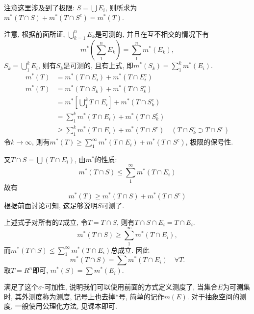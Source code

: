 \documentclass[12pt,a4paper,openany]{book}
\begin{document}
\begin{enumerate}
\begin{enumerate}
注意这里涉及到了极限: $S = \bigcup{E_i}$, 则所求为$m^*(T \cap S) + m^*(T \cap S^c) = m^*(T)$.

注意, 根据前面所证, $\bigcup_{k=1}^{n}{E_k}$是可测的, 并且在互不相交的情况下有
\[
m^*(\sum_{1}^{n}{E_k}) = \sum_{1}^{n}{m^*(E_k)},
\]
$S_k = \bigcup_{1}^{k}{E_i}$, 则有$S_k$是可测的, 且有上式, 即$m^*(S_k) = \sum_{1}^{k}{m^*(E_i)}$.
\[
\begin{aligned}
m^*(T) &= m^*(T \cap E_i) + m^*(T \cap E_i^c) \\
m^*(T) &= m^*(T \cap S_k) + m^*(T \cap S_k^c) \\
&= m^*[\bigcup_{1}^{k}{T \cap E_i}] + m^*(T \cap S_k^c) \\
&= \sum_{1}^{k}{m^*(T \cap E_i)} + m^*(T \cap S_k^c) \\
&\ge \sum_{1}^{k}{m^*(T \cap E_i)} + m^*(T \cap S^c) \quad (T \cap S_k^c \supset T \cap S^c)
\end{aligned}
\]
令$k \rightarrow \infty$, 则有$m^*(T) \ge \sum_{1}^{\infty}{m^*(T \cap E_i)} + m^*(T \cap S^c)$, 极限的保号性.

又$T \cap S = \bigcup(T \cap E_i)$, 由$m^*$的性质:
\[
m^*(T \cap S) \le \sum_{1}^{\infty}{m^*(T \cap E_i)} 
\]
故有
\[
m^*(T) \ge m^*(T \cap S) + m^*(T \cap S^c)
\]
根据前面讨论可知, 这足够说明$S$可测了.

上述式子对所有的$T$成立, 令$T = T \cap S$, 则有$T \cap S \cap E_i = T \cap E_i$.
\[
m^*(T \cap S) \ge \sum_{1}^{\infty}{m^*(T \cap E_i)},
\]
而$m^*(T \cap S) \le \sum_{1}^{\infty}{m^*(T \cap E_i)}$总成立. 因此
\[
m^*(T \cap S) = \sum{m^*(T \cap E_i)} \quad \forall T.
\]
取$T = R^n$即可, $m^*(S) = \sum{m^*(E_i)}$.

满足了这个$\sigma$-可加性, 说明我们可以使用前面的方式定义测度了, 当集合$E$为可测集时, 其外测度称为测度, 记号上也去掉$*$号, 简单的记作$m(E)$. 对于抽象空间的测度, 一般使用公理化方法, 见课本即可.
\end{enumerate}
\end{enumerate}
\end{document}
